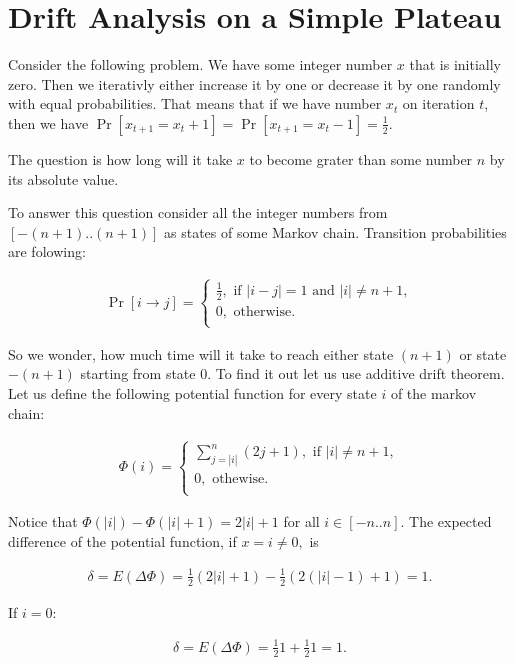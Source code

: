 \documentclass{article}
\begin{document}
\section{Drift Analysis on a Simple Plateau}
Consider the following problem. We have some integer number $x$ that is initially zero. Then we iterativly either increase it by one or decrease it by one randomly with equal probabilities. That means that if we have number $x_t$ on iteration $t$, then we have $\Pr[x_{t + 1} = x_t + 1] = \Pr[x_{t + 1} = x_t - 1] = \frac{1}{2}.$

The question is how long will it take $x$ to become grater than some number $n$ by its absolute value.

To answer this question consider all the integer numbers from $[-(n + 1)..(n + 1)]$ as states of some Markov chain. Transition probabilities are folowing:

\begin{align*}
  \Pr[i \to j] =
  \begin{cases}
    \frac{1}{2}, \text{ if } |i - j| = 1 \text{ and } |i| \ne n + 1, \\
    0, \text{ otherwise.}\\
  \end{cases}
\end{align*}

So we wonder, how much time will it take to reach either state $(n + 1)$ or state $-(n + 1)$ starting from state $0.$ To find it out let us use additive drift theorem. Let us define the following potential function for every state $i$ of the markov chain:

\begin{align*}
  \Phi(i) =
  \begin{cases}
    \sum\limits_{j = |i|}^n (2j + 1), \text{ if } |i| \ne n + 1, \\
    0, \text{ othewise.}\\
  \end{cases}
\end{align*}

Notice that $\Phi(|i|) - \Phi(|i| + 1) = 2|i| + 1$ for all $i \in [-n..n].$
The expected difference of the potential function, if $x = i \ne 0,$ is

\begin{align*}
  \delta = E(\Delta\Phi) = \frac{1}{2} (2|i| + 1) - \frac{1}{2}(2(|i| - 1) + 1) = 1.
\end{align*}

If $i = 0:$


\begin{align*}
  \delta = E(\Delta\Phi) = \frac{1}{2} 1 + \frac{1}{2} 1 = 1.
\end{align*}
\end{document}
